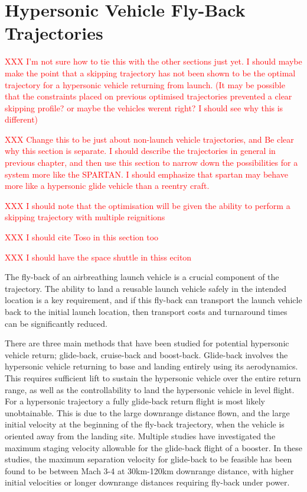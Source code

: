 \section{Hypersonic Vehicle Fly-Back Trajectories}
\textcolor{red}{XXX I'm not sure how to tie this with the other sections just yet. I should maybe make the point that a skipping trajectory has not been shown to be the optimal trajectory for a hypersonic vehicle returning from launch. (It may be possible that the constraints placed on previous optimised trajectories prevented a clear skipping profile? or maybe the vehicles werent right? I should see why this is different)}

\textcolor{red}{XXX Change this to be just about non-launch vehicle trajectories, and Be clear why this section is separate. I should describe the trajectories in general in previous chapter, and then use this section to narrow down the possibilities for a system more like the SPARTAN. I should emphasize that spartan may behave more like a hypersonic glide vehicle than a reentry craft. }

\textcolor{red}{XXX I should note that the optimisation will be given the ability to perform a skipping trajectory with multiple reignitions}

\textcolor{red}{XXX I should cite Toso in this section too}

\textcolor{red}{XXX  I should have the space shuttle in thiss eciton}

The fly-back of an airbreathing launch vehicle is a crucial component of the trajectory. The ability to land a reusable launch vehicle safely in the intended location is a key requirement, and if this fly-back can transport the launch vehicle back to the initial launch location, then transport costs and turnaround times can be significantly reduced. 

There are three main methods that have been studied for potential hypersonic vehicle return; glide-back, cruise-back and boost-back. Glide-back involves the hypersonic vehicle returning to base and landing entirely using its aerodynamics. This requires sufficient lift to sustain the hypersonic vehicle over the entire return range, as well as the controllability to land the hypersonic vehicle in level flight. 
For a hypersonic trajectory a fully glide-back return flight is most likely unobtainable. This is due to the large downrange distance flown, and the large initial velocity at the beginning of the fly-back trajectory, when the vehicle is oriented away from the landing site. Multiple studies have investigated the maximum staging velocity allowable for the glide-back flight of a booster. 
In these studies, the maximum separation velocity for glide-back to be feasible has been found to be between Mach 3-4 at 30km-120km downrange distance, with higher initial velocities or longer downrange distances requiring fly-back under power\cite{Hellman,Tetlow1992}.


